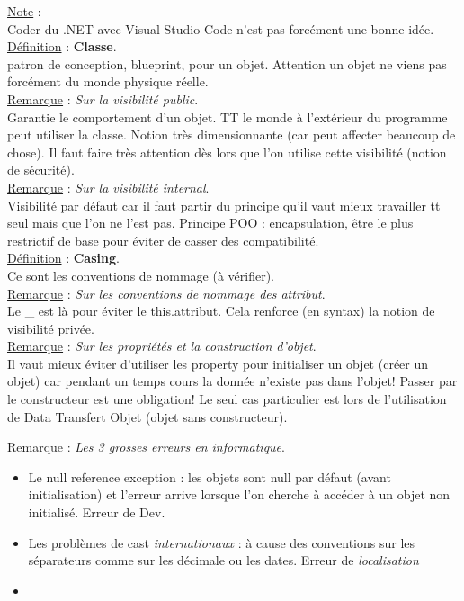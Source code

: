 \documentclass[a4paper,12pt,twoside]{article}
\newcommand{\incode}[1]{{\footnotesize\ttfamily #1}} %
\newcommand{\rem}[2]{\noindent\underline{Remarque} : \textit{#1}.\\ \indent #2}
\newcommand{\note}[1]{\noindent\underline{Note} : \\ \indent #1}
\newcommand{\defi}[2]{\noindent\underline{Définition} : \textbf{#1}.\\ \indent #2}
\begin{document}
\note{Coder du .NET avec Visual Studio Code n'est pas forcément une bonne idée.} \\

\defi{Classe}{patron de conception, blueprint, pour un objet. Attention un objet ne viens pas forcément du monde physique réelle.}\\

\rem{Sur la visibilité public}{Garantie le comportement d'un objet. TT le monde à l'extérieur du programme peut utiliser la classe. Notion très dimensionnante (car peut affecter beaucoup de chose). Il faut faire très attention dès lors que l'on utilise cette visibilité (notion de sécurité).}\\

\rem{Sur la visibilité internal}{Visibilité par défaut car il faut partir du principe qu'il vaut mieux travailler tt seul mais que l'on ne l'est pas. Principe POO : encapsulation, être le plus restrictif de base pour éviter de casser des compatibilité.}\\

\defi{Casing}{Ce sont les conventions de nommage (à vérifier).}\\

\rem{Sur les conventions de nommage des attribut}{Le \_ est là pour éviter le \incode{this.attribut}. Cela renforce (en syntax) la notion de visibilité privée.}\\

\rem{Sur les propriétés et la construction d'objet}{Il vaut mieux éviter d'utiliser les property pour initialiser un objet (créer un objet) car pendant un temps cours la donnée n'existe pas dans l'objet! Passer par le constructeur est une obligation! Le seul cas particulier est lors de l'utilisation de Data Transfert Objet (objet sans constructeur).}

\rem{Les 3 grosses erreurs en informatique}{
\begin{itemize}
 \item Le \incode{null reference exception} : les objets sont \incode{null} par défaut (avant initialisation) et l'erreur arrive lorsque l'on cherche à accéder à un objet non initialisé. Erreur de Dev.
 \item Les problèmes de cast \textit{internationaux} : à cause des conventions sur les séparateurs comme sur les décimale ou les dates. Erreur de \textit{localisation}
 \item \\ 
\end{itemize}
}
\end{document}
